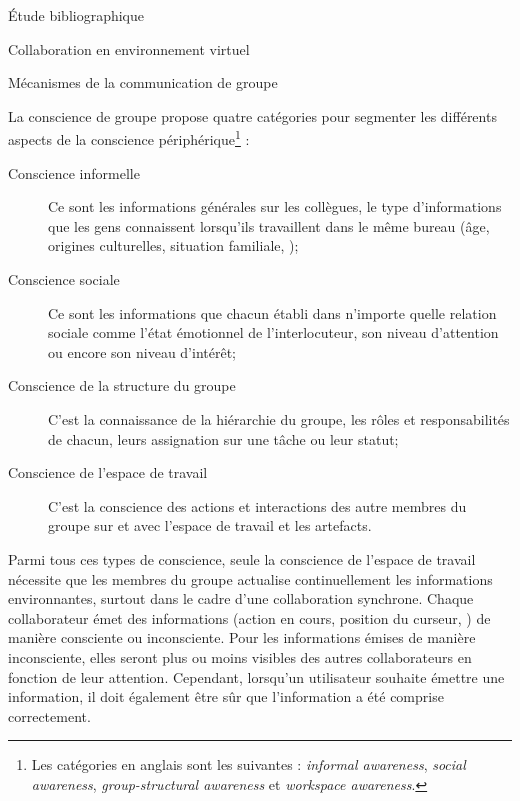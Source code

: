 \documentclass[myfrancais,ngerman,english,french]{mythesis}
\begin{document}
\begin{mychapter}{Étude bibliographique}
\begin{mysection}{Collaboration en environnement virtuel}
\begin{mysubsection}{Mécanismes de la communication de groupe}
\begin{mysubsubsection}{La conscience de groupe}
					 propose quatre catégories pour segmenter les différents aspects de la conscience périphérique\footnote{Les catégories en anglais sont les suivantes : \textit{informal awareness}, \textit{social awareness}, \textit{group-structural awareness} et \textit{workspace awareness}.} :
					\begin{description}
						\item[Conscience informelle] Ce sont les informations générales sur les collègues, le type d'informations que les gens connaissent lorsqu'ils travaillent dans le même bureau (âge, origines culturelles, situation familiale, \myetc);
						\item[Conscience sociale] Ce sont les informations que chacun établi dans n'importe quelle relation sociale comme l'état émotionnel de l'interlocuteur, son niveau d'attention ou encore son niveau d'intérêt;
						\item[Conscience de la structure du groupe] C'est la connaissance de la hiérarchie du groupe, les rôles et responsabilités de chacun, leurs assignation sur une tâche ou leur statut;
						\item[Conscience de l'espace de travail] C'est la conscience des actions et interactions des autre membres du groupe sur et avec l'espace de travail et les artefacts.
					\end{description}

					Parmi tous ces types de conscience, seule la conscience de l'espace de travail nécessite que les membres du groupe actualise continuellement les informations environnantes, surtout dans le cadre d'une collaboration synchrone.
					Chaque collaborateur émet des informations (action en cours, position du curseur, \myetc) de manière consciente ou inconsciente.
					Pour les informations émises de manière inconsciente, elles seront plus ou moins visibles des autres collaborateurs en fonction de leur attention.
					Cependant, lorsqu'un utilisateur souhaite émettre une information, il doit également être sûr que l'information a été comprise correctement.


\end{mysubsubsection}
\end{mysubsection}
\end{mysection}
\end{mychapter}
\end{document}

